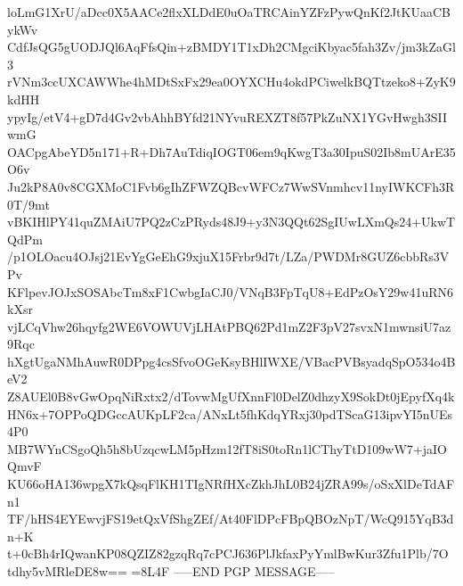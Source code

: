loLmG1XrU/aDcc0X5AACe2flxXLDdE0uOaTRCAinYZFzPywQnKf2JtKUaaCBykWv
CdfJsQG5gUODJQl6AqFfsQin+zBMDY1T1xDh2CMgciKbyac5fah3Zv/jm3kZaGl3
rVNm3ccUXCAWWhe4hMDtSxFx29ea0OYXCHu4okdPCiwelkBQTtzeko8+ZyK9kdHH
ypyIg/etV4+gD7d4Gv2vbAhhBYfd21NYvuREXZT8f57PkZuNX1YGvHwgh3SIIwmG
OACpgAbeYD5n171+R+Dh7AuTdiqIOGT06em9qKwgT3a30IpuS02Ib8mUArE35O6v
Ju2kP8A0v8CGXMoC1Fvb6gIhZFWZQBcvWFCz7WwSVnmhcv11nyIWKCFh3R0T/9mt
vBKIHlPY41quZMAiU7PQ2zCzPRyds48J9+y3N3QQt62SgIUwLXmQs24+UkwTQdPm
/p1OLOacu4OJsj21EvYgGeEhG9xjuX15Frbr9d7t/LZa/PWDMr8GUZ6cbbRs3VPv
KFlpevJOJxSOSAbcTm8xF1CwbgIaCJ0/VNqB3FpTqU8+EdPzOsY29w41uRN6kXsr
vjLCqVhw26hqyfg2WE6VOWUVjLHAtPBQ62Pd1mZ2F3pV27svxN1mwnsiU7az9Rqc
hXgtUgaNMhAuwR0DPpg4csSfvoOGeKsyBHlIWXE/VBacPVBsyadqSpO534o4BeV2
Z8AUEl0B8vGwOpqNiRxtx2/dTovwMgUfXnnFl0DelZ0dhzyX9SokDt0jEpyfXq4k
HN6x+7OPPoQDGccAUKpLF2ca/ANxLt5fhKdqYRxj30pdTScaG13ipvYI5nUEs4P0
MB7WYnCSgoQh5h8bUzqcwLM5pHzm12fT8iS0toRn1lCThyTtD109wW7+jaIOQmvF
KU66oHA136wpgX7kQsqFlKH1TIgNRfHXcZkhJhL0B24jZRA99s/oSxXlDeTdAFn1
TF/hHS4EYEwvjFS19etQxVfShgZEf/At40FlDPcFBpQBOzNpT/WcQ915YqB3dn+K
t+0cBh4rIQwanKP08QZIZ82gzqRq7cPCJ636PlJkfaxPyYmlBwKur3Zfu1Plb/7O
tdhy5vMRleDE8w==
=8L4F
-----END PGP MESSAGE-----
